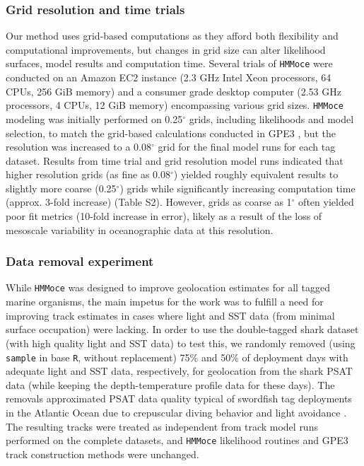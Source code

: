 \subsubsection*{Grid resolution and time
trials}%

Our method uses grid-based computations as they afford both flexibility
and computational improvements, but changes in grid size can alter
likelihood surfaces, model results and computation time. Several trials
of \texttt{HMMoce} were conducted on an Amazon EC2 instance (2.3 GHz
Intel Xeon processors, 64 CPUs, 256 GiB memory) and a consumer grade
desktop computer (2.53 GHz processors, 4 CPUs, 12 GiB memory)
encompassing various grid sizes. \texttt{HMMoce} modeling was initially
performed on 0.25$^{\circ}$ grids, including likelihoods and model selection, to
match the grid-based calculations conducted in GPE3 \citep{WC2015}, but
the resolution was increased to a 0.08$^{\circ}$ grid for the final model runs
for each tag dataset. Results from time trial and grid resolution model
runs indicated that higher resolution grids (as fine as 0.08$^{\circ}$) yielded
roughly equivalent results to slightly more coarse (0.25$^{\circ}$) grids while
significantly increasing computation time (approx. 3-fold increase)
(Table S2). However, grids as coarse as 1$^{\circ}$ often yielded poor fit
metrics (10-fold increase in error), likely as a result of the loss of
mesoscale variability in oceanographic data at this resolution.

\subsubsection*{Data removal experiment}%

While \texttt{HMMoce} was designed to improve geolocation estimates for
all tagged marine organisms, the main impetus for the work was to
fulfill a need for improving track estimates in cases where light and
SST data (from minimal surface occupation) were lacking. In order to use
the double-tagged shark dataset (with high quality light and SST data)
to test this, we randomly removed (using \texttt{sample} in base
\texttt{R}, without replacement) 75\% and 50\% of deployment days with
adequate light and SST data, respectively, for geolocation from the
shark PSAT data (while keeping the depth-temperature profile data for
these days). The removals approximated PSAT data quality typical of
swordfish tag deployments in the Atlantic Ocean due to crepuscular
diving behavior and light avoidance \citep{Braun2015, Neilson2009}. The
resulting tracks were treated as independent from track model runs
performed on the complete datasets, and \texttt{HMMoce} likelihood
routines and GPE3 track construction methods were unchanged.

